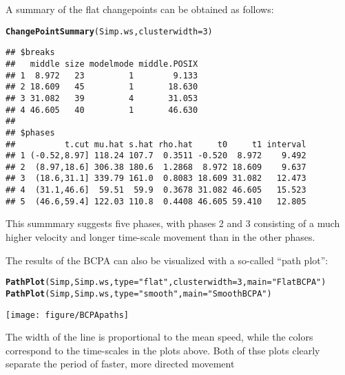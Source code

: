 \documentclass[10pt]{article}\usepackage[]{graphicx}\usepackage[]{color}
\makeatletter
\def\maxwidth{ %
  \ifdim\Gin@nat@width>\linewidth
    \linewidth
  \else
    \Gin@nat@width
  \fi
}
\newcommand{\hlnum}[1]{\textcolor[rgb]{0.686,0.059,0.569}{#1}}%
\newcommand{\hlstr}[1]{\textcolor[rgb]{0.192,0.494,0.8}{#1}}%
\newcommand{\hlstd}[1]{\textcolor[rgb]{0.345,0.345,0.345}{#1}}%
\newcommand{\hlkwc}[1]{\textcolor[rgb]{0.333,0.667,0.333}{#1}}%
\newcommand{\hlkwd}[1]{\textcolor[rgb]{0.737,0.353,0.396}{\textbf{#1}}}%
\newenvironment{kframe}{%
 \def\at@end@of@kframe{}%
 \ifinner\ifhmode%
  \def\at@end@of@kframe{\end{minipage}}%
  \begin{minipage}{\columnwidth}%
 \fi\fi%
 \def\FrameCommand##1{\hskip\@totalleftmargin \hskip-\fboxsep
 \colorbox{shadecolor}{##1}\hskip-\fboxsep
     \hskip-\linewidth \hskip-\@totalleftmargin \hskip\columnwidth}%
 \MakeFramed {\advance\hsize-\width
   \@totalleftmargin\z@ \linewidth\hsize
   \@setminipage}}%
 {\par\unskip\endMakeFramed%
 \at@end@of@kframe}
\newenvironment{knitrout}{}{} %
\makeatother
\begin{document}
A summary of the flat changepoints can be obtained as follows: 
\begin{knitrout}
\color{fgcolor}\begin{kframe}
\begin{alltt}
\hlkwd{ChangePointSummary}\hlstd{(Simp.ws,} \hlkwc{clusterwidth} \hlstd{=} \hlnum{3}\hlstd{)}
\end{alltt}
\begin{verbatim}
## $breaks
##   middle size modelmode middle.POSIX
## 1  8.972   23         1        9.133
## 2 18.609   45         1       18.630
## 3 31.082   39         4       31.053
## 4 46.605   40         1       46.630
## 
## $phases
##          t.cut mu.hat s.hat rho.hat     t0     t1 interval
## 1 (-0.52,8.97] 118.24 107.7  0.3511 -0.520  8.972    9.492
## 2  (8.97,18.6] 306.38 180.6  1.2868  8.972 18.609    9.637
## 3  (18.6,31.1] 339.79 161.0  0.8083 18.609 31.082   12.473
## 4  (31.1,46.6]  59.51  59.9  0.3678 31.082 46.605   15.523
## 5  (46.6,59.4] 122.03 110.8  0.4408 46.605 59.410   12.805
\end{verbatim}
\end{kframe}
\end{knitrout}

This summmary suggests five phases, with phases 2 and 3 consisting of a much higher velocity and longer time-scale movement than in the other phases.

The results of the BCPA can also be visualized with a so-called ``path plot'':
\begin{knitrout}
\color{fgcolor}\begin{kframe}
\begin{alltt}
\hlkwd{PathPlot}\hlstd{(Simp, Simp.ws,} \hlkwc{type} \hlstd{=} \hlstr{"flat"}\hlstd{,} \hlkwc{clusterwidth} \hlstd{=} \hlnum{3}\hlstd{,} \hlkwc{main} \hlstd{=} \hlstr{"Flat BCPA"}\hlstd{)}
\hlkwd{PathPlot}\hlstd{(Simp, Simp.ws,} \hlkwc{type} \hlstd{=} \hlstr{"smooth"}\hlstd{,} \hlkwc{main} \hlstd{=} \hlstr{"Smooth BCPA"}\hlstd{)}
\end{alltt}
\end{kframe}
\texttt{[image: figure/BCPApaths]} 

\end{knitrout}

The width of the line is proportional to the mean speed, while the colors correspond to the time-scales in the plots above.  Both of thse plots clearly separate the period of faster, more directed movement
\end{document}
